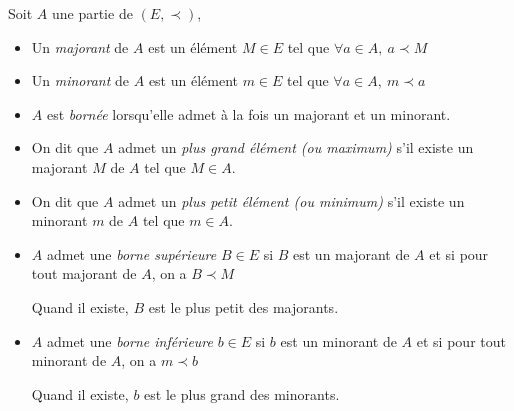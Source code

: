 \documentclass[../main.tex]{subfile}
\begin{document}
\begin{defi}
	Soit $A$ une partie de $(E, \prec)$, 
	\begin{itemize}
		\item Un \emph{majorant} de $A$ est un élément $M \in E$ tel que $\forall a \in A, \ a \prec M$
		\item Un \emph{minorant} de $A$ est un élément $m \in E$ tel que $\forall a \in A, \ m \prec a$
		\item $A$ est \emph{bornée} lorsqu'elle admet à la fois un majorant et un minorant.
		\item On dit que $A$ admet un \emph{plus grand élément (ou maximum)} s'il existe un majorant $M$ de $A$ tel que $M \in A$.
		\item On dit que $A$ admet un \emph{plus petit élément (ou minimum)} s'il existe un minorant $m$ de $A$ tel que $m \in A$.
		\item $A$ admet une \emph{borne supérieure} $B \in E$ si $B$ est un majorant de $A$ et si pour tout majorant de $A$, on a $B \prec M$
		\begin{rema}
			Quand il existe, $B$ est le plus petit des majorants.
		\end{rema}
		\item $A$ admet une \emph{borne inférieure} $b \in E$ si $b$ est un minorant de $A$ et si pour tout minorant de $A$, on a $m \prec b$
		\begin{rema}
			Quand il existe, $b$ est le plus grand des minorants.
		\end{rema}
	\end{itemize}
\end{defi}
\end{document}
